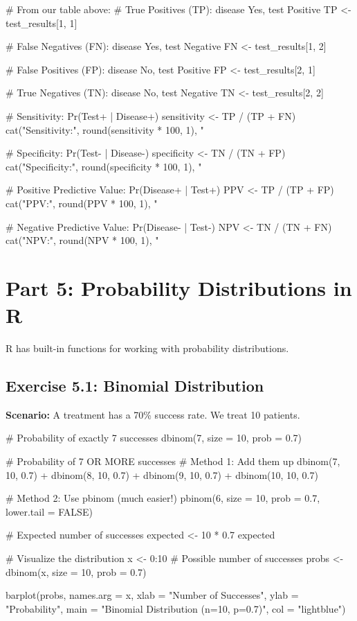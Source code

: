 \documentclass[11pt]{article}
\begin{document}
\begin{rcode}
# From our table above:
# True Positives (TP): disease Yes, test Positive
TP <- test_results[1, 1]

# False Negatives (FN): disease Yes, test Negative
FN <- test_results[1, 2]

# False Positives (FP): disease No, test Positive
FP <- test_results[2, 1]

# True Negatives (TN): disease No, test Negative
TN <- test_results[2, 2]

# Sensitivity: Pr(Test+ | Disease+)
sensitivity <- TP / (TP + FN)
cat("Sensitivity:", round(sensitivity * 100, 1), "%

# Specificity: Pr(Test- | Disease-)
specificity <- TN / (TN + FP)
cat("Specificity:", round(specificity * 100, 1), "%

# Positive Predictive Value: Pr(Disease+ | Test+)
PPV <- TP / (TP + FP)
cat("PPV:", round(PPV * 100, 1), "%

# Negative Predictive Value: Pr(Disease- | Test-)
NPV <- TN / (TN + FN)
cat("NPV:", round(NPV * 100, 1), "%
\end{rcode}

\section{Part 5: Probability Distributions in R}

R has built-in functions for working with probability distributions.

\subsection{Exercise 5.1: Binomial Distribution}

\textbf{Scenario:} A treatment has a 70\% success rate. We treat 10 patients.

\begin{rcode}
# Probability of exactly 7 successes
dbinom(7, size = 10, prob = 0.7)

# Probability of 7 OR MORE successes
# Method 1: Add them up
dbinom(7, 10, 0.7) + dbinom(8, 10, 0.7) +
  dbinom(9, 10, 0.7) + dbinom(10, 10, 0.7)

# Method 2: Use pbinom (much easier!)
pbinom(6, size = 10, prob = 0.7, lower.tail = FALSE)

# Expected number of successes
expected <- 10 * 0.7
expected

# Visualize the distribution
x <- 0:10  # Possible number of successes
probs <- dbinom(x, size = 10, prob = 0.7)

barplot(probs,
        names.arg = x,
        xlab = "Number of Successes",
        ylab = "Probability",
        main = "Binomial Distribution (n=10, p=0.7)",
        col = "lightblue")
\end{rcode}
\end{document}
